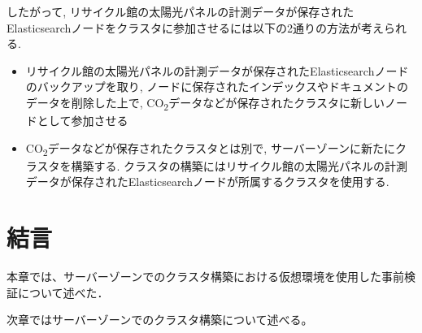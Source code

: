 
したがって, リサイクル館の太陽光パネルの計測データが保存されたElasticsearchノードをクラスタに参加させるには以下の2通りの方法が考えられる.

\begin{itemize}
  \item リサイクル館の太陽光パネルの計測データが保存されたElasticsearchノードのバックアップを取り, ノードに保存されたインデックスやドキュメントのデータを削除した上で, CO\textsubscript{2}データなどが保存されたクラスタに新しいノードとして参加させる
  \item CO\textsubscript{2}データなどが保存されたクラスタとは別で, サーバーゾーンに新たにクラスタを構築する. クラスタの構築にはリサイクル館の太陽光パネルの計測データが保存されたElasticsearchノードが所属するクラスタを使用する.
\end{itemize}

\section{結言}
本章では、サーバーゾーンでのクラスタ構築における仮想環境を使用した事前検証について述べた．

次章ではサーバーゾーンでのクラスタ構築について述べる。
